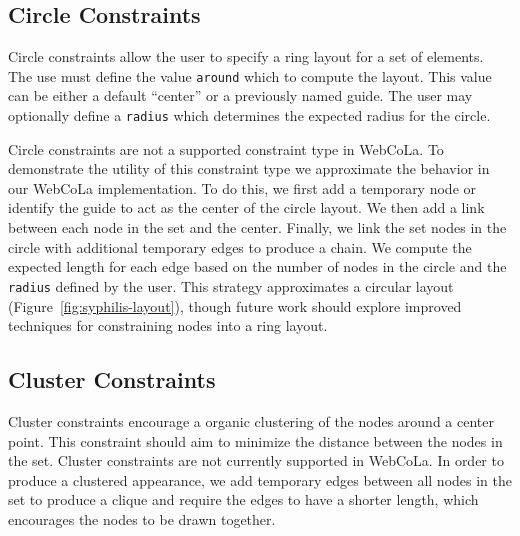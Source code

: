 
\subsection{Circle Constraints}
Circle constraints allow the user to specify a ring layout for a set of
elements. The use must define the value \texttt{around} which to compute 
the layout. This value can be either a default ``center'' or a previously 
named guide. The user may optionally define a \texttt{radius} which 
determines the expected radius for the circle.



Circle constraints are not a supported constraint type in WebCoLa. To
demonstrate the utility of this constraint type we approximate the behavior
in our WebCoLa implementation. To do this, we first add a temporary node
or identify the guide to act as the center of the circle layout.  We
then add a link between each
node in the set and the center. Finally, we link the set nodes in the circle
with additional temporary edges to produce a chain. We compute the expected
length for each edge based on the number of nodes in the circle and the 
\texttt{radius} defined by the user. This strategy approximates a circular
layout (Figure~\ref{fig:syphilis-layout}), though future work should
explore improved techniques for constraining nodes into a ring layout. 


\subsection{Cluster Constraints}
Cluster constraints encourage a organic clustering of the nodes around
a center point. This constraint should aim to minimize the distance between
the nodes in the set.
Cluster constraints are not currently supported in WebCoLa. In order to
produce a clustered appearance, we add temporary edges between all nodes
in the set to produce a clique and require the edges to have a shorter length,
which encourages the nodes to be drawn together.

